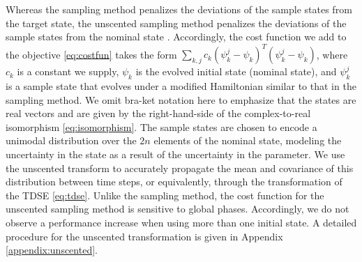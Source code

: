 Whereas the sampling method penalizes the deviations of the sample states
from the target state, the unscented sampling method
penalizes the deviations of the sample states from the nominal state
\cite{howell2020direct, lee2013sigma,
  thangavel2020robust}. Accordingly, the cost function we add
to the objective \eqref{eq:costfun} takes the form
$\sum_{k, j} c_{k} (\psi^{j}_{k} - \psi_{k})^{T}
(\psi^{j}_{k} - \psi_{k})$, where $c_{k}$ is a
constant we supply, $\psi_{k}$ is
the evolved initial state (nominal state), and $\psi^{j}_{k}$ is a sample state
that evolves under a modified Hamiltonian similar to that in the sampling method.
We omit bra-ket notation here to emphasize that
the states are real vectors and are given by the right-hand-side of the
complex-to-real isomorphism \eqref{eq:isomorphism}.
The sample states are chosen to encode a unimodal distribution over
the $2n$ elements of the nominal state, modeling the uncertainty in the state
as a result of the uncertainty in the parameter. We use the unscented transform
\cite{julier2004unscented, uhlmann1995dynamic}
to accurately propagate the mean and covariance of this distribution between
time steps, or equivalently, through the transformation of the TDSE \eqref{eq:tdse}.
Unlike the sampling method, the cost function for the unscented sampling method
is sensitive to global phases. Accordingly, we
do not observe a performance increase when
using more than one initial state. 
A detailed procedure for the unscented transformation is given
in Appendix \ref{appendix:unscented}.

